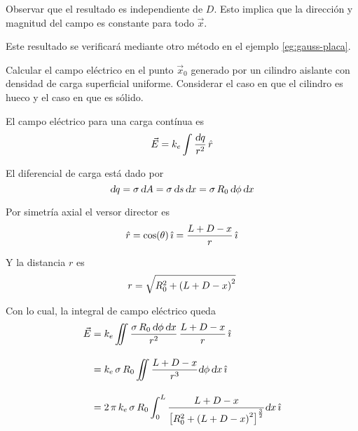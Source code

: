 \begin{mdframed}[style=ExampleFrame]
    Observar que el resultado es independiente de $D$.
    Esto implica que la dirección y magnitud del campo es constante para todo $\vec{x}$.
    
    Este resultado se verificará mediante otro método en el ejemplo \ref{eg:gauss-placa}.
\end{mdframed}

\begin{mdframed}[style=ExampleFrame]
    \begin{example}
    \end{example}
    \begin{formatI}
        Calcular el campo eléctrico en el punto $\vec{x}_0$ generado por un cilindro aislante con densidad de carga superficial uniforme.
        Considerar el caso en que el cilindro es hueco y el caso en que es sólido.
    \end{formatI}
    \begin{center}
        \def\svgwidth{\linewidth}
        
    \end{center}

    El campo eléctrico para una carga contínua es
    \begin{equation*}
        \vec{E} = k_e \int \frac{\textsl{d} q}{r^2} \, \hat{r}
    \end{equation*}


    El diferencial de carga está dado por
    \begin{equation*}
        \textsl{d} q = \sigma \, \textsl{d} A
        = \sigma \, \textsl{d} s \, \textsl{d} x
        = \sigma \, R_0 \, \textsl{d} \phi \, \textsl{d} x
    \end{equation*}

    Por simetría axial el versor director es
    \begin{equation*}
        \hat{r} = \cos(\theta) \, \hat{\imath}
        = \frac{L+D-x}{r} \, \hat{\imath}
    \end{equation*}

    Y la distancia $r$ es
    \begin{equation*}
        r = \sqrt{R_0^2 + \left(L+D-x\right)^2}
    \end{equation*}

    Con lo cual, la integral de campo eléctrico queda
    \begin{align*}
        \vec{E} &= k_e \iint \frac{\sigma \, R_0 \, \textsl{d} \phi \, \textsl{d} x}{r^2} \, \frac{L+D-x}{r} \, \hat{\imath}
        \\[1em]
        &= k_e \, \sigma \, R_0 \iint \frac{L+D-x}{r^3} \textsl{d} \phi \, \textsl{d} x \, \hat{\imath}
        \\[1em]
        &= 2 \, \pi \, k_e \, \sigma \, R_0 \int_0^L \frac{L+D-x}{{ \begin{bmatrix} R_0^2 + \left(L+D-x\right)^2 \end{bmatrix} }^{\frac{3}{2}}} \textsl{d} x \, \hat{\imath}
    \end{align*}


\end{mdframed}
